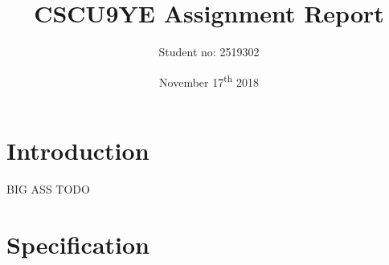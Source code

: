 \documentclass[11pt, a4paper]{article}
\title{CSCU9YE Assignment Report}
\author{Student no: 2519302}
\date{November 17\textsuperscript{th} 2018}
\begin{document}
\begin{titlepage}
\maketitle
\clearpage\thispagestyle{empty}
\end{titlepage}
\doublespacing
{}
\tableofcontents
\thispagestyle{empty}
\newpage
\singlespacing

\section{Introduction}

BIG ASS TODO
\newpage
\section{Specification}
\end{document}
